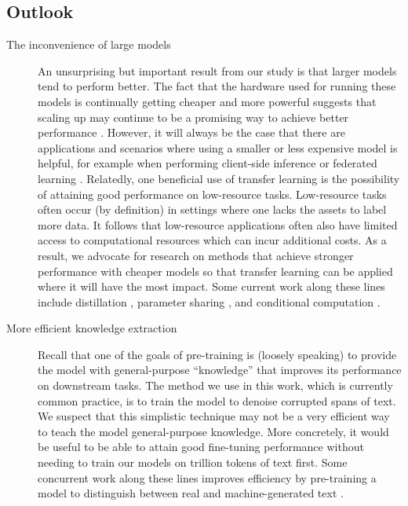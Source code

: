 \documentclass[twoside,11pt]{article}
\begin{document}
\subsection{Outlook}

\begin{description}

\item[The inconvenience of large models] An unsurprising but important result from our study is that larger models tend to perform better.
The fact that the hardware used for running these models is continually getting cheaper and more powerful suggests that scaling up may continue to be a promising way to achieve better performance \citep{sutton2019bitter}.
However, it will always be the case that there are applications and scenarios where using a smaller or less expensive model is helpful, for example when performing client-side inference or federated learning \citep{konevcny2015federated,konevcny2016federated}.
Relatedly, one beneficial use of transfer learning is the possibility of attaining good performance on low-resource tasks.
Low-resource tasks often occur (by definition) in settings where one lacks the assets to label more data.
It follows that low-resource applications often also have limited access to computational resources which can incur additional costs.
As a result, we advocate for research on methods that achieve stronger performance with cheaper models so that transfer learning can be applied where it will have the most impact.
Some current work along these lines include distillation \citep{hinton2015distilling,sanh2019distilbert,jiao2019tinybert}, parameter sharing \citep{lan2019albert}, and conditional computation \citep{shazeer2017outrageously}.

\item[More efficient knowledge extraction] Recall that one of the goals of pre-training is (loosely speaking) to provide the model with general-purpose ``knowledge'' that improves its performance on downstream tasks.
The method we use in this work, which is currently common practice, is to train the model to denoise corrupted spans of text.
We suspect that this simplistic technique may not be a very efficient way to teach the model general-purpose knowledge.
More concretely, it would be useful to be able to attain good fine-tuning performance without needing to train our models on  trillion tokens of text first.
Some concurrent work along these lines improves efficiency by pre-training a model to distinguish between real and machine-generated text \citep{clark2020electra}.


\end{description}
\end{document}
